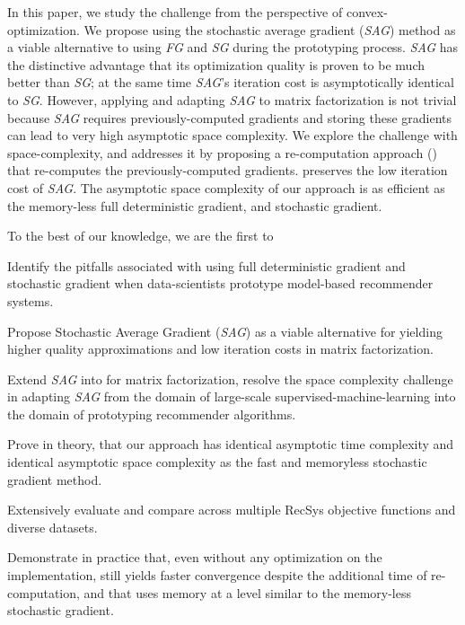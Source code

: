 In this paper, we study the challenge from the perspective of convex-optimization.  
We propose using the stochastic average gradient (\emph{SAG}) method \cite{schmidt2013minimizing, roux2012stochastic} as a viable alternative to using \emph{FG} and \emph{SG} during the prototyping process.  
\emph{SAG} has the distinctive advantage that its optimization quality is proven to be much better than \emph{SG}; at the same time \emph{SAG}'s iteration cost is asymptotically identical to \emph{SG}.  
However, applying and adapting \emph{SAG} to matrix factorization is not trivial because \emph{SAG} requires previously-computed gradients and storing these gradients can lead to very high asymptotic space complexity.  
We explore the challenge with space-complexity, and addresses it by proposing a re-computation approach (\tool) that re-computes the previously-computed gradients.  
\tool preserves the low iteration cost of \emph{SAG}.  
The asymptotic space complexity of our \tool approach is as efficient as the memory-less full deterministic gradient, and stochastic gradient.  

To the best of our knowledge, we are the first to
\begin{compactitem}
\item Identify the pitfalls associated with using full deterministic gradient and stochastic gradient when data-scientists prototype model-based recommender systems.  
\item Propose Stochastic Average Gradient (\emph{SAG}) as a viable alternative for yielding higher quality approximations and low iteration costs in matrix factorization.  
\item Extend \emph{SAG} into \tool for matrix factorization, resolve the space complexity challenge in adapting \emph{SAG} from the domain of large-scale supervised-machine-learning into the domain of prototyping recommender algorithms.  
\item Prove in theory, that our \tool approach has identical asymptotic time complexity and identical asymptotic space complexity as the fast and memoryless stochastic gradient method.  
\item Extensively evaluate and compare \tool across multiple RecSys objective functions and diverse datasets.  
\item Demonstrate in practice that, even without any optimization on the implementation, \tool still yields faster convergence despite the additional time of re-computation, and that \tool uses memory at a level similar to the memory-less stochastic gradient.  
\end {compactitem}
